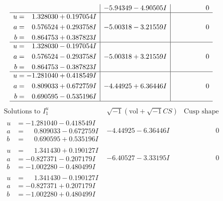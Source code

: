 \documentclass[1p]{elsarticle_modified}
\theoremstyle{definition}
\newcommand{\I}{\sqrt{-1}}
\begin{document}
$$\begin{array}{c|c|c}
 & -5.94349 - 4.90505 I & \phantom{-0.000000 } 0 \\ \hline\begin{aligned}
u &= \phantom{-}1.328030 + 0.197054 I \\
a &= \phantom{-}0.576524 + 0.293758 I \\
b &= \phantom{-}0.864753 + 0.387823 I\end{aligned}
 & -5.00318 - 3.21559 I & \phantom{-0.000000 } 0 \\ \hline\begin{aligned}
u &= \phantom{-}1.328030 - 0.197054 I \\
a &= \phantom{-}0.576524 - 0.293758 I \\
b &= \phantom{-}0.864753 - 0.387823 I\end{aligned}
 & -5.00318 + 3.21559 I & \phantom{-0.000000 } 0 \\ \hline\begin{aligned}
u &= -1.281040 + 0.418549 I \\
a &= \phantom{-}0.809033 + 0.672759 I \\
b &= \phantom{-}0.690595 - 0.535196 I\end{aligned}
 & -4.44925 + 6.36446 I & \phantom{-0.000000 } 0\\
 \hline 
 \end{array}$$\newpage$$\begin{array}{c|c|c}  
\text{Solutions to }I^u_{1}& \I (\text{vol} + \sqrt{-1}CS) & \text{Cusp shape}\\
 \hline 
\begin{aligned}
u &= -1.281040 - 0.418549 I \\
a &= \phantom{-}0.809033 - 0.672759 I \\
b &= \phantom{-}0.690595 + 0.535196 I\end{aligned}
 & -4.44925 - 6.36446 I & \phantom{-0.000000 } 0 \\ \hline\begin{aligned}
u &= \phantom{-}1.341430 + 0.190127 I \\
a &= -0.827371 - 0.207179 I \\
b &= -1.002280 - 0.480499 I\end{aligned}
 & -6.40527 - 3.33195 I & \phantom{-0.000000 } 0 \\ \hline\begin{aligned}
u &= \phantom{-}1.341430 - 0.190127 I \\
a &= -0.827371 + 0.207179 I \\
b &= -1.002280 + 0.480499 I\end{aligned}

\end{array}$$
\end{document}
